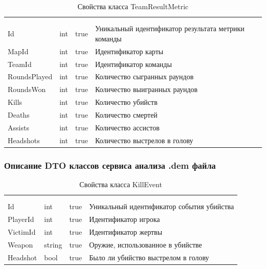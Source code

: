 \begin{xltabular}{\textwidth}{|X|X|X|X|}
	\caption{Свойства класса TeamResultMetric}\label{table:TeamResultMetric}\\ \hline
	 &  &  &  \\ \hline
	 &  &  &  \\ \hline
	\endfirsthead
	 \hline
	 &  &  &  \\ \hline
	\endhead
	Id & int & true & Уникальный идентификатор результата метрики команды \\ \hline
	MapId & int & true & Идентификатор карты \\ \hline
	TeamId & int & true & Идентификатор команды \\ \hline
	RoundsPlayed & int & true & Количество сыгранных раундов \\ \hline
	RoundsWon & int & true & Количество выигранных раундов \\ \hline
	Kills & int & true & Количество убийств \\ \hline
	Deaths & int & true & Количество смертей \\ \hline
	Assists & int & true & Количество ассистов \\ \hline
	Headshots & int & true & Количество выстрелов в голову \\ \hline
\end{xltabular}

\subsubsection{Описание DTO классов сервиса анализа .dem файла}

\begin{xltabular}{\textwidth}{|X|X|X|X|}
	\caption{Свойства класса KillEvent}\label{table:KillEvent}\\ \hline
	 &  &  &  \\ \hline
	 &  &  &  \\ \hline
	\endfirsthead
	 \hline
	 &  &  &  \\ \hline
	\endhead
	Id & int & true & Уникальный идентификатор события убийства \\ \hline
	PlayerId & int & true & Идентификатор игрока \\ \hline
	VictimId & int & true & Идентификатор жертвы \\ \hline
	Weapon & string & true & Оружие, использованное в убийстве \\ \hline
	Headshot & bool & true & Было ли убийство выстрелом в голову \\ \hline
\end{xltabular}

